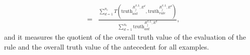 \begin{itemize}
\begin{definition}
\begin{eqnarray*}
			&=&  \frac{\displaystyle \sum_{d=1}^{n_e} T(\text{truth}_{ant}^{R^{S,L}_j,E^d},\text{truth}_{rule}^{R^{S,L}_j,E^d})}{\displaystyle \sum_{d=1}^{n_e} \text{truth}_{ant}^{R^{S,L}_j,E^d}},
		\end{eqnarray*}
		and it measures the quotient of the overall truth value of the evaluation of the rule and the overall truth value of the antecedent for all examples.
	\end{definition}
%	

\end{itemize}
